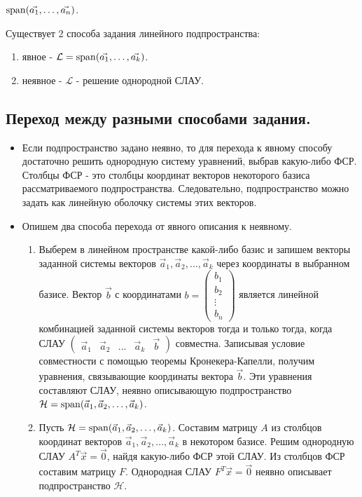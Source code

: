 \begin{designation}
    $\operatorname{\mathop{\mathrm{span}}}(\vec{a_1}, \ldots, \vec{a_n})$.
\end{designation}

Существует 2 способа задания линейного подпространства:

\begin{enumerate}
    \item явное - $\mathcal{L} = \operatorname{\mathop{\mathrm{span}}}(\vec{a_1}, \ldots, \vec{a_k})$.
    \item неявное - $\mathcal{L}$ - решение однородной СЛАУ.
\end{enumerate}

\subsection*{Переход между разными способами задания.
}

\begin{itemize}
    \item Если подпространство задано неявно, то для перехода к явному способу достаточно решить однородную систему уравнений, выбрав какую-либо ФСР. Столбцы ФСР - это столбцы координат векторов некоторого базиса рассматриваемого подпространства. Следовательно, подпространство можно задать как линейную оболочку системы этих векторов.
    \item Опишем два способа перехода от явного описания к неявному.

    \begin{enumerate}
        \item Выберем в линейном пространстве какой-либо базис и запишем векторы заданной системы векторов $\vec{a}_1, \vec{a}_2, \ldots, \vec{a}_k$ через координаты в выбранном базисе. Вектор $\vec{b}$ с координатами $b = \begin{pmatrix}
            b_1 \\
            b_2 \\
            \vdots \\
            b_n
        \end{pmatrix}$ является линейной комбинацией заданной системы векторов тогда и только тогда, когда СЛАУ $\begin{pmatrix}
            \vec{a}_1 & \vec{a}_2 & \ldots & \vec{a}_k & \vec{b}
        \end{pmatrix}$ совместна. Записывая условие совместности с помощью теоремы Кронекера-Капелли, получим уравнения, связывающие координаты вектора $\vec{b}$. Эти уравнения составляют СЛАУ, неявно описывающую подпространство $\mathcal{H} = \operatorname{\mathop{\mathrm{span}}}(\vec{a}_1, \vec{a}_2, \ldots, \vec{a}_k)$.
    
    \item Пусть $\mathcal{H} = \operatorname{\mathop{\mathrm{span}}}(\vec{a}_1, \vec{a}_2, \ldots, \vec{a}_k)$. Составим матрицу $A$ из столбцов координат векторов $\vec{a}_1, \vec{a}_2, \ldots, \vec{a}_k$ в некотором базисе. Решим однородную СЛАУ $A^T\vec{x} = \vec{0}$, найдя какую-либо ФСР этой СЛАУ. Из столбцов ФСР составим матрицу $F$. Однородная СЛАУ $F^T\vec{x} = \vec{0}$ неявно описывает подпространство $\mathcal{H}$.
    \end{enumerate}
\end{itemize}

